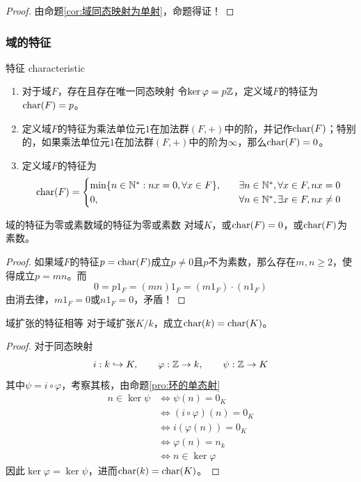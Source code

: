 \begin{proof}
	由命题\ref{cor:域同态映射为单射}，命题得证！
\end{proof}

\subsubsection{域的特征}

\begin{definition}{特征 characteristic}
	\begin{enumerate}
		\item 对于域$F$，存在且存在唯一同态映射
		令$\ker\varphi=p\mathbb{Z}$，定义域$F$的特征为$\text{char}(F)=p$。
		\item 定义域$F$的特征为乘法单位元$1$在加法群$(F,+)$中的阶，并记作$\text{char}(F)$；特别的，如果乘法单位元$1$在加法群$(F,+)$中的阶为$\infty$，那么$\text{char}(F)=0$。
		\item 定义域$F$的特征为
		$$
		\text{char}(F)=\begin{cases}
			\min\{ n\in\mathbb{N}^*:nx=0,\forall x\in F \},\quad & \exists n\in\mathbb{N}^*,\forall x\in F,nx=0\\
			0,\quad & \forall n\in\mathbb{N}^*,\exists x\in F,nx\ne0
		\end{cases}
		$$
	\end{enumerate}
\end{definition}

\begin{proposition}{域的特征为零或素数}{域的特征为零或素数}
	对域$K$，或$\text{char}(F)=0$，或$\text{char}(F)$为素数。
\end{proposition}

\begin{proof}
	如果域$F$的特征$p=\text{char}(F)$成立$p\ne 0$且$p$不为素数，那么存在$m,n\ge 2$，使得成立$p=mn$。而%
	$$
	0=p1_F=(mn)1_F=(m1_F)\cdot (n1_F)
	$$
	由消去律，$m1_F=0$或$n1_F=0$，矛盾！
\end{proof}

\begin{proposition}{}{域扩张的特征相等}
	对于域扩张$K/k$，成立$\text{char}(k)=\text{char}(K)$。
\end{proposition}

\begin{proof}
	 对于同态映射%
	 $$
	 i:k\hookrightarrow K,\qquad 
	 \varphi:\mathbb{Z}\to k,\qquad
	 \psi:\mathbb{Z}\to K
	 $$
	 其中$\psi=i\circ \varphi$，考察其核，由命题\ref{pro:环的单态射}
	 \begin{align*}
	 	n\in \ker\psi
	 	& \iff \psi(n)=0_K\\
	 	& \iff (i\circ \varphi)(n)=0_K\\
	 	& \iff i(\varphi(n))=0_K\\
	 	& \iff \varphi(n)=n_k\\
	 	& \iff n\in \ker\varphi
	 \end{align*}
 	因此$\ker\varphi=\ker\psi$，进而$\text{char}(k)=\text{char}(K)$。
\end{proof}

